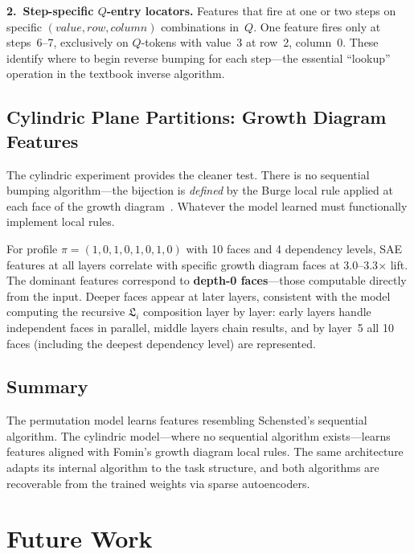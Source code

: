 \documentclass[11pt,a4paper]{article}
\begin{document}
\textbf{2.~Step-specific $Q$-entry locators.}
Features that fire at one or two steps on specific $(value, row, column)$ combinations in~$Q$. One feature fires only at steps~6--7, exclusively on $Q$-tokens with value~3 at row~2, column~0. These identify where to begin reverse bumping for each step---the essential ``lookup'' operation in the textbook inverse algorithm.

\subsection{Cylindric Plane Partitions: Growth Diagram Features}

The cylindric experiment provides the cleaner test. There is no sequential bumping algorithm---the bijection is \emph{defined} by the Burge local rule applied at each face of the growth diagram~\cite{langer2013,langer2012}. Whatever the model learned must functionally implement local rules.

For profile $\pi = (1,0,1,0,1,0,1,0)$ with 10 faces and 4 dependency levels, SAE features at all layers correlate with specific growth diagram faces at 3.0--3.3$\times$ lift. The dominant features correspond to \textbf{depth-0 faces}---those computable directly from the input. Deeper faces appear at later layers, consistent with the model computing the recursive $\mathfrak{L}_i$ composition layer by layer: early layers handle independent faces in parallel, middle layers chain results, and by layer~5 all 10 faces (including the deepest dependency level) are represented.

\subsection{Summary}

The permutation model learns features resembling Schensted's sequential algorithm. The cylindric model---where no sequential algorithm exists---learns features aligned with Fomin's growth diagram local rules. The same architecture adapts its internal algorithm to the task structure, and both algorithms are recoverable from the trained weights via sparse autoencoders.

\section{Future Work}
\end{document}
